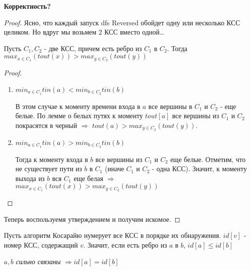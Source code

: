 \textbf{Корректность?}

\begin{proof}
  Ясно, что каждый запуск dfs Reversed обойдет одну или несколько КСС целиком. Но вдруг мы возьмем 2 КСС вместо одной\dots

  \begin{proposition}
    \text{}

    Пусть $C_1, C_2$ - две КСС, причем есть ребро из $C_1$ в $C_2$. Тогда $max_{x \in C_1}(tout(x)) > max_{y \in C_2}(tout(y))$
  \end{proposition}
  \begin{proof}
    \text{}

    \begin{enumerate}
      \item $min_{a \in C_1} tin(a) < min_{b \in C_2} tin(b)$
      
      В этом случае к моменту времени входа в $a$ все вершины в $C_1$ и $C_2$ - еще белые. По лемме о белых путях к  моменту $tout[a]$ все вершины из $C_1$ и $C_2$ покрасятся в черный $\Longrightarrow$ $tout(a) > max_{y \in C_2}(tout(y))$.
    

    \item $min_{a \in C_1} tin(a) > min_{b \in C_2} tin(b)$
    
    Тогда к моменту входа в $b$ все вершины из $C_1$ и $C_2$ еще белые. Отметим, что не существует пути из $b$ в $C_1$ (иначе $C_1$ и $C_2$ - одна КСС). Значит, к моменту выхода из $b$ вся $C_1$ еще белая $\Longrightarrow$ $max_{x \in C_1}(tout(x)) > max_{y \in C_2}(tout(y))$
  \end{enumerate}
  \end{proof}

  Теперь воспользуемя утверждением и получим искомое.
\end{proof}

\begin{note}
  Пусть алгоритм Косарайю нумерует все КСС в порядке их обнаружения. $id[v]$ - номер КСС, содержащий $v$. Значит, если есть ребро из $a$ в $b$, $id[a] \leq id[b]$
\end{note}

\textit{$a, b$ сильно связаны $\Longrightarrow id[a] = id[b]$}